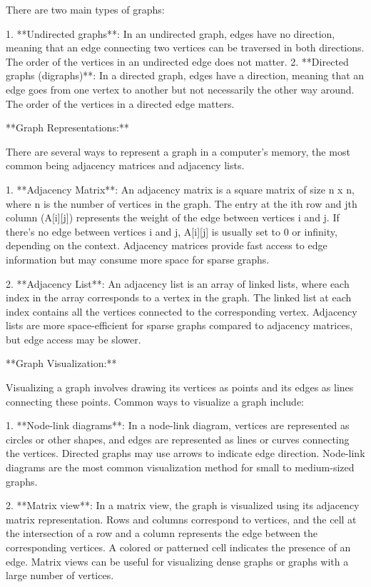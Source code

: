 \documentclass{article}
\begin{document}
There are two main types of graphs:

1. **Undirected graphs**: In an undirected graph, edges have no direction, meaning that an edge connecting two vertices can be traversed in both directions. The order of the vertices in an undirected edge does not matter.
2. **Directed graphs (digraphs)**: In a directed graph, edges have a direction, meaning that an edge goes from one vertex to another but not necessarily the other way around. The order of the vertices in a directed edge matters.

**Graph Representations:**

There are several ways to represent a graph in a computer's memory, the most common being adjacency matrices and adjacency lists.

1. **Adjacency Matrix**: An adjacency matrix is a square matrix of size n x n, where n is the number of vertices in the graph. The entry at the ith row and jth column (A[i][j]) represents the weight of the edge between vertices i and j. If there's no edge between vertices i and j, A[i][j] is usually set to 0 or infinity, depending on the context. Adjacency matrices provide fast access to edge information but may consume more space for sparse graphs.

2. **Adjacency List**: An adjacency list is an array of linked lists, where each index in the array corresponds to a vertex in the graph. The linked list at each index contains all the vertices connected to the corresponding vertex. Adjacency lists are more space-efficient for sparse graphs compared to adjacency matrices, but edge access may be slower.

**Graph Visualization:**

Visualizing a graph involves drawing its vertices as points and its edges as lines connecting these points. Common ways to visualize a graph include:

1. **Node-link diagrams**: In a node-link diagram, vertices are represented as circles or other shapes, and edges are represented as lines or curves connecting the vertices. Directed graphs may use arrows to indicate edge direction. Node-link diagrams are the most common visualization method for small to medium-sized graphs.

2. **Matrix view**: In a matrix view, the graph is visualized using its adjacency matrix representation. Rows and columns correspond to vertices, and the cell at the intersection of a row and a column represents the edge between the corresponding vertices. A colored or patterned cell indicates the presence of an edge. Matrix views can be useful for visualizing dense graphs or graphs with a large number of vertices.
\end{document}
